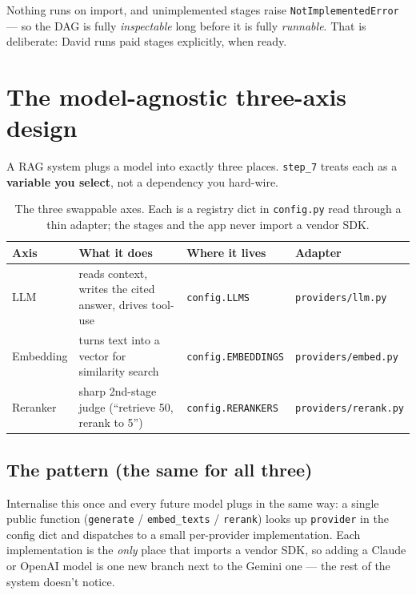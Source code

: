 \documentclass[11pt]{article}
\newcommand{\code}[1]{\texttt{#1}}
\begin{document}
Nothing runs on import, and unimplemented stages raise \code{NotImplementedError} --- so the DAG is
fully \emph{inspectable} long before it is fully \emph{runnable}. That is deliberate: David runs paid
stages explicitly, when ready.

\FloatBarrier
\section{The model-agnostic three-axis design}\label{sec:axes}

A RAG system plugs a model into exactly three places. \code{step\_7} treats each as a \textbf{variable
you select}, not a dependency you hard-wire.

\begin{table}[h]
\centering\small
\begin{tabular}{@{}llll@{}}
\toprule
\textbf{Axis} & \textbf{What it does} & \textbf{Where it lives} & \textbf{Adapter} \\
\midrule
LLM & reads context, writes the cited answer, drives tool-use & \code{config.LLMS} & \code{providers/llm.py} \\
Embedding & turns text into a vector for similarity search & \code{config.EMBEDDINGS} & \code{providers/embed.py} \\
Reranker & sharp 2nd-stage judge (``retrieve 50, rerank to 5'') & \code{config.RERANKERS} & \code{providers/rerank.py} \\
\bottomrule
\end{tabular}
\caption{The three swappable axes. Each is a registry dict in \code{config.py} read through a thin
adapter; the stages and the app never import a vendor SDK.}
\end{table}

\subsection{The pattern (the same for all three)}

Internalise this once and every future model plugs in the same way: a single public function
(\code{generate} / \code{embed\_texts} / \code{rerank}) looks up \code{provider} in the config dict
and dispatches to a small per-provider implementation. Each implementation is the \emph{only} place
that imports a vendor SDK, so adding a Claude or OpenAI model is one new branch next to the Gemini
one --- the rest of the system doesn't notice.
\end{document}
